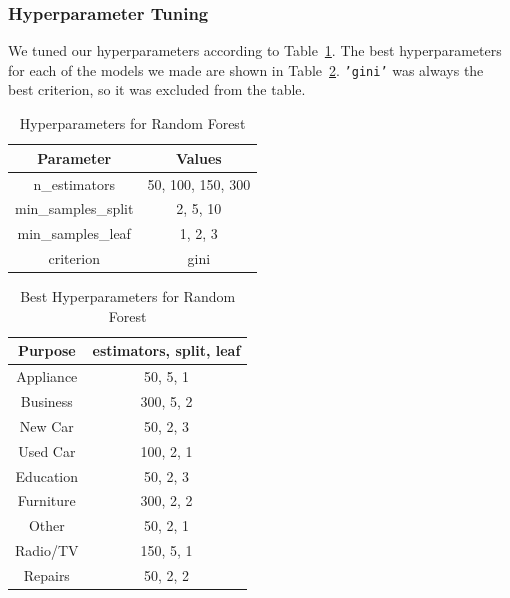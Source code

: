 \documentclass[12pt,twocolumn]{article}
\begin{document}
\subsubsection{Hyperparameter Tuning}
We tuned our hyperparameters according to Table~\ref{tab:random_forest_hyperparameters}. The best hyperparameters for each of the models we made are shown in Table~\ref{tab:random_forest_best_hyperparameters}. \texttt{'gini'} was always the best criterion, so it was excluded from the table.
\begin{table}
    \centering
    \begin{tabular}{|c|c|}
        \hline
        Parameter & Values \\
        \hline
        \hline
        n\_estimators & 50, 100, 150, 300 \\
        \hline
        min\_samples\_split & 2, 5, 10 \\
        \hline
        min\_samples\_leaf & 1, 2, 3 \\
        \hline
        criterion & gini \\
        \hline
    \end{tabular}
    \caption{Hyperparameters for Random Forest}\label{tab:random_forest_hyperparameters}
\end{table}

\begin{table}
    \centering
    \begin{tabular}{|c|c|}
        \hline
        Purpose & estimators, split, leaf \\
        \hline
        \hline
        Appliance & 50, 5, 1 \\
        \hline
        Business & 300, 5, 2 \\
        \hline
        New Car & 50, 2, 3 \\
        \hline
        Used Car & 100, 2, 1 \\
        \hline
        Education & 50, 2, 3 \\
        \hline
        Furniture & 300, 2, 2 \\
        \hline
        Other & 50, 2, 1 \\
        \hline
        Radio/TV & 150, 5, 1 \\
        \hline
        Repairs & 50, 2, 2 \\
        \hline
    \end{tabular}
    \caption{Best Hyperparameters for Random Forest}\label{tab:random_forest_best_hyperparameters}
\end{table}
\end{document}
